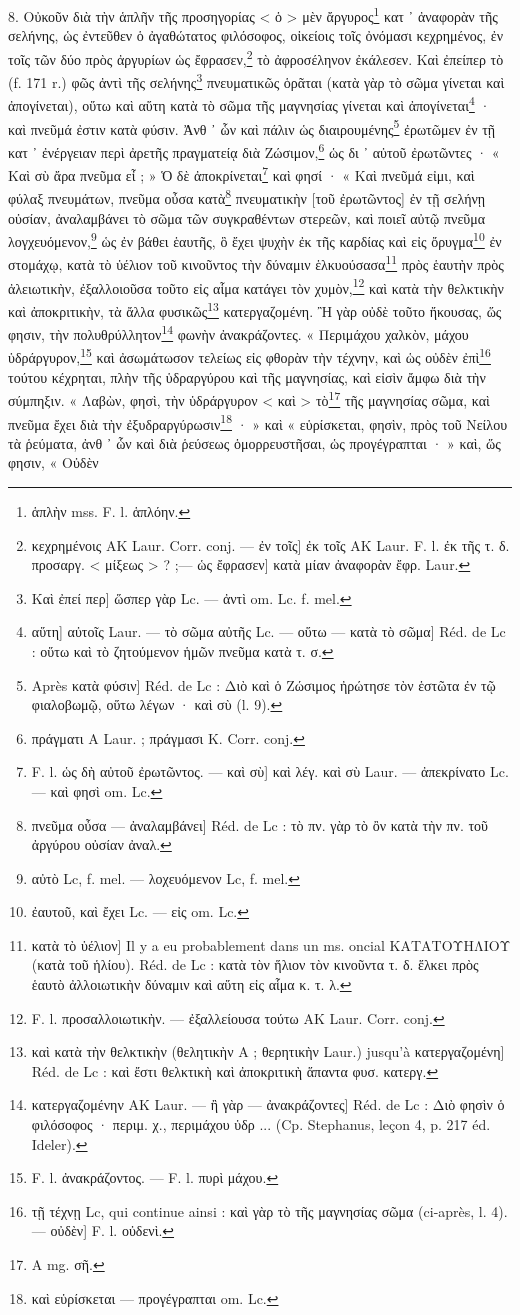 \documentclass[a4paper, 11pt, oneside, polutonikogreek, french]{article}
\begin{document}
8. Οὐκοῦν διὰ τὴν ἁπλῆν τῆς προσηγορίας < ὁ > μὲν ἄργυρος\footnote{ἁπλὴν mss. F. l. ἁπλόην.} κατ ᾽ ἀναφορὰν τῆς σελήνης, ὡς ἐντεῦθεν ὁ ἀγαθώτατος φιλόσοφος, οἰκείοις τοῖς ὀνόμασι κεχρημένος, ἐν τοῖς τῶν δύο πρὸς ἀργυρίων ὡς ἔφρασεν,\footnote{κεχρημένοις AK Laur. Corr. conj. --- ἐν τοῖς] ἐκ τοῖς AK Laur. F. l. ἐκ τῆς τ. δ. προσαργ. < μίξεως > ? ;--- ὡς ἔφρασεν] κατὰ μίαν ἀναφορὰν ἔφρ. Laur.} τὸ ἀφροσέληνον ἐκάλεσεν. Καὶ ἐπείπερ τὸ (f. 171 r.) φῶς ἀντὶ τῆς σελήνης\footnote{Καὶ ἐπεί περ] ὥσπερ γὰρ Lc. --- ἀντὶ om. Lc. f. mel.} πνευματικῶς ὁρᾶται (κατὰ γὰρ τὸ σῶμα γίνεται καὶ ἀπογίνεται), οὕτω καὶ αὕτη κατὰ τὸ σῶμα τῆς μαγνησίας γίνεται καὶ ἀπογίνεται\footnote{αὕτη] αὐτοῖς Laur. --- τὸ σῶμα αὐτῆς Lc. --- οὕτω --- κατὰ τὸ σῶμα] Réd. de Lc : οὕτω καὶ τὸ ζητούμενον ἡμῶν πνεῦμα κατὰ τ. σ.} · καὶ πνεῦμά ἐστιν κατὰ φύσιν. Ἀνθ ᾽ ὧν καὶ πάλιν ὡς διαιρουμένης\footnote{Après κατὰ φύσιν] Réd. de Lc : Διὸ καὶ ὁ Ζώσιμος ἠρώτησε τὸν ἑστῶτα ἐν τῷ φιαλοβωμῷ, οὕτω λέγων · καὶ σὺ (l. 9).} ἐρωτῶμεν ἐν τῇ κατ ᾽ ἐνέργειαν περὶ ἀρετῆς πραγματείᾳ διὰ Ζώσιμον,\footnote{πράγματι A Laur. ; πράγμασι K. Corr. conj.} ὡς δι ᾽ αὐτοῦ ἐρωτῶντες · « Καὶ σὺ ἄρα πνεῦμα εἶ ; » Ὁ δὲ ἀποκρίνεται\footnote{F. l. ὡς δὴ αὐτοῦ ἐρωτῶντος. --- καὶ σὺ] καὶ λέγ. καὶ σὺ Laur. --- ἀπεκρίνατο Lc. --- καὶ φησὶ om. Lc.} καὶ φησί · « Καὶ πνεῦμά εἰμι, καὶ φύλαξ πνευμάτων, πνεῦμα οὖσα κατὰ\footnote{πνεῦμα οὖσα --- ἀναλαμβάνει] Réd. de Lc : τὸ πν. γὰρ τὸ ὂν κατὰ τὴν πν. τοῦ ἀργύρου οὐσίαν ἀναλ.} πνευματικὴν [τοῦ ἐρωτῶντος] ἐν τῇ σελήνῃ οὐσίαν, ἀναλαμβάνει τὸ σῶμα τῶν συγκραθέντων στερεῶν, καὶ ποιεῖ αὐτῷ πνεῦμα λογχευόμενον,\footnote{αὐτὸ Lc, f. mel. --- λοχευόμενον Lc, f. mel.} ὡς ἐν βάθει ἑαυτῆς, ὃ ἔχει ψυχὴν ἐκ τῆς καρδίας καὶ εἰς ὄρυγμα\footnote{ἐαυτοῦ, καὶ ἔχει Lc. --- εἰς om. Lc.} ἐν στομάχῳ, κατὰ τὸ ὑέλιον τοῦ κινοῦντος τὴν δύναμιν ἑλκυούσασα\footnote{κατὰ τὸ ὑέλιον] Il y a eu probablement dans un ms. oncial ΚΑΤΑΤΟΥΗΛΙΟΥ (κατὰ τοῦ ἡλίου). Réd. de Lc : κατὰ τὸν ἥλιον τὸν κινοῦντα τ. δ. ἕλκει πρὸς ἑαυτὸ ἀλλοιωτικὴν δύναμιν καὶ αὕτη εἰς αἷμα κ. τ. λ.} πρὸς ἑαυτὴν πρὸς ἀλειωτικὴν, ἐξαλλοιοῦσα τοῦτο εἰς αἷμα κατάγει τὸν χυμὸν,\footnote{F. l. προσαλλοιωτικὴν. --- ἐξαλλείουσα τούτω AK Laur. Corr. conj.} καὶ κατὰ τὴν θελκτικὴν καὶ ἀποκριτικὴν, τὰ ἄλλα φυσικῶς\footnote{καὶ κατὰ τὴν θελκτικὴν (θελητικὴν A ; θερητικὴν Laur.) jusqu'à κατεργαζομένη] Réd. de Lc : καὶ ἔστι θελκτικὴ καὶ ἀποκριτικὴ ἅπαντα φυσ. κατεργ.} κατεργαζομένη. Ἢ γὰρ οὐδὲ τοῦτο ἤκουσας, ὥς φησιν, τὴν πολυθρύλλητον\footnote{κατεργαζομένην AK Laur. --- ἢ γὰρ --- ἀνακράζοντες] Réd. de Lc : Διὸ φησὶν ὁ φιλόσοφος · περιμ. χ., περιμάχου ὑδρ ... (Cp. Stephanus, leçon 4, p. 217 éd. Ideler).} φωνὴν ἀνακράζοντες. « Περιμάχου χαλκὸν, μάχου ὑδράργυρον,\footnote{F. l. ἀνακράζοντος. --- F. l. πυρὶ μάχου.} καὶ ἀσωμάτωσον τελείως εἰς φθορὰν τὴν τέχνην, καὶ ὡς οὐδὲν ἐπὶ\footnote{τῇ τέχνῃ Lc, qui continue ainsi : καὶ γὰρ τὸ τῆς μαγνησίας σῶμα (ci-après, l. 4). --- οὐδὲν] F. l. οὐδενὶ.} τούτου κέχρηται, πλὴν τῆς ὑδραργύρου καὶ τῆς μαγνησίας, καὶ εἰσὶν ἄμφω διὰ τὴν σύμπηξιν. « Λαβὼν, φησὶ, τὴν ὑδράργυρον < καὶ > τὸ\footnote{A mg. σῆ.} τῆς μαγνησίας σῶμα, καὶ πνεῦμα ἔχει διὰ τὴν ἐξυδραργύρωσιν\footnote{καὶ εὑρίσκεται --- προγέγραπται om. Lc.} · » καὶ « εὑρίσκεται, φησὶν, πρὸς τοῦ Νείλου τὰ ῥεύματα, ἀνθ ᾽ ὧν καὶ διὰ ῥεύσεως ὁμορρευστῆσαι, ὡς προγέγραπται · » καὶ, ὥς φησιν, « Οὐδὲν 
\end{document}
